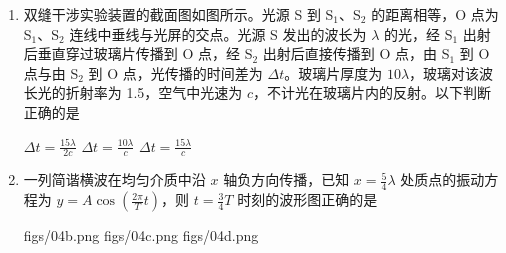 \documentclass[\gkver]{gaokaozhenti}
\begin{document}
\begin{enumerate}
{个。

因在 $\beta$ 衰变中，一个氚核产生一个电子，可知氚核的个数为 $1.0\times10^{16}$ 个。

故选 B。
}

\item
双缝干涉实验装置的截面图如图所示。光源 S 到 S$_{1}$、S$_{2}$ 的距离相等，O 点为 S$_{1}$、S$_{2}$ 连线中垂线与光屏的交点。光源 S 发出的波长为 $\lambda$ 的光，经 S$_{1}$ 出射后垂直穿过玻璃片传播到 O 点，经 S$_{2}$ 出射后直接传播到 O 点，由 S$_{1}$ 到 O 点与由 S$_{2}$ 到 O 点，光传播的时间差为 $\Delta t$。玻璃片厚度为 $10\lambda$，玻璃对该波长光的折射率为 1.5，空气中光速为 $c$，不计光在玻璃片内的反射。以下判断正确的是


{$\Delta t=\frac{15\lambda}{2c}$}
{$\Delta t=\frac{10\lambda}{c}$}
{$\Delta t=\frac{15\lambda}{c}$}


\item
一列简谐横波在均匀介质中沿 $x$ 轴负方向传播，已知 $x=\frac{5}{4}\lambda$ 处质点的振动方程为 $y=A\cos\left(\frac{2\pi}{T}t\right)$，则 $t=\frac{3}{4}T$ 时刻的波形图正确的是

{figs/04b.png}
{figs/04c.png}
{figs/04d.png}

\end{enumerate}
\end{document}
